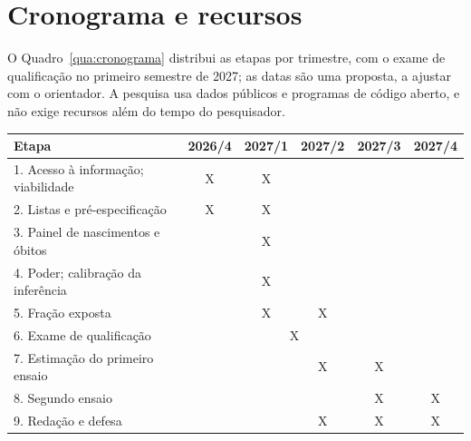 \chapter{Cronograma e recursos}
\label{sec:cronograma}

O Quadro~\ref{qua:cronograma} distribui as etapas por trimestre, com o exame
de qualificação no primeiro semestre de 2027; as datas são uma proposta, a
ajustar com o orientador. A pesquisa usa dados públicos e
programas de código aberto, e não exige recursos além do tempo do pesquisador.

\begin{quadro}[ht]
\centering\small
\caption{Cronograma proposto}
\label{qua:cronograma}
\begin{tabular}{|l|c|c|c|c|c|}
\hline
Etapa & 2026/4 & 2027/1 & 2027/2 & 2027/3 & 2027/4 \\
\hline
1. Acesso à informação; viabilidade & X & X & & & \\ \hline
2. Listas e pré-especificação     & X & X & & & \\ \hline
3. Painel de nascimentos e óbitos &   & X & & & \\ \hline
4. Poder; calibração da inferência &   & X & & & \\ \hline
5. Fração exposta                 &   & X & X & & \\ \hline
6. Exame de qualificação          &   & \multicolumn{2}{c|}{X} & & \\ \hline
7. Estimação do primeiro ensaio   &   &   & X & X & \\ \hline
8. Segundo ensaio                 &   &   &   & X & X \\ \hline
9. Redação e defesa               &   &   & X & X & X \\ \hline
\end{tabular}
\end{quadro}
